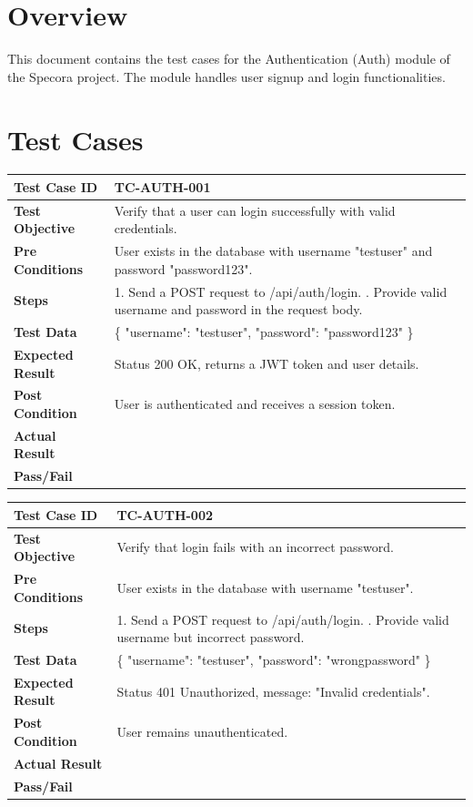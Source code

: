 \section{Overview}
This document contains the test cases for the Authentication (Auth) module of the Specora project. The module handles user signup and login functionalities.

\section{Test Cases}

\begin{longtable}{|p{}|p{}|}
\hline
\textbf{Test Case ID} & TC-AUTH-001 \\ \hline
\textbf{Test Objective} & Verify that a user can login successfully with valid credentials. \\ \hline
\textbf{Pre Conditions} & User exists in the database with username "testuser" and password "password123". \\ \hline
\textbf{Steps} & 
1. Send a POST request to /api/auth/login. \newline
2. Provide valid username and password in the request body. \\ \hline
\textbf{Test Data} & \{ "username": "testuser", "password": "password123" \} \\ \hline
\textbf{Expected Result} & Status 200 OK, returns a JWT token and user details. \\ \hline
\textbf{Post Condition} & User is authenticated and receives a session token. \\ \hline
\textbf{Actual Result} &  \\ \hline
\textbf{Pass/Fail} &  \\ \hline
\end{longtable}

\begin{longtable}{|p{}|p{}|}
\hline
\textbf{Test Case ID} & TC-AUTH-002 \\ \hline
\textbf{Test Objective} & Verify that login fails with an incorrect password. \\ \hline
\textbf{Pre Conditions} & User exists in the database with username "testuser". \\ \hline
\textbf{Steps} & 
1. Send a POST request to /api/auth/login. \newline
2. Provide valid username but incorrect password. \\ \hline
\textbf{Test Data} & \{ "username": "testuser", "password": "wrongpassword" \} \\ \hline
\textbf{Expected Result} & Status 401 Unauthorized, message: "Invalid credentials". \\ \hline
\textbf{Post Condition} & User remains unauthenticated. \\ \hline
\textbf{Actual Result} &  \\ \hline
\textbf{Pass/Fail} &  \\ \hline
\end{longtable}

